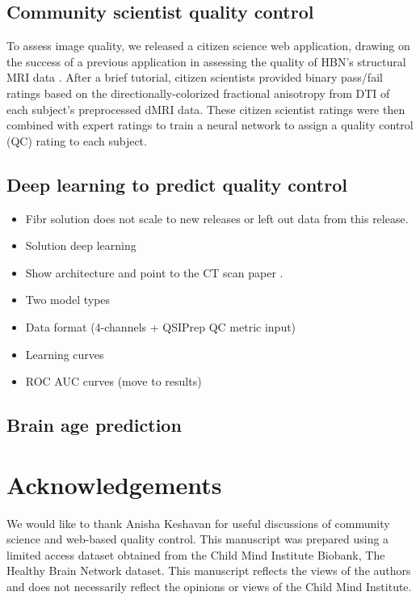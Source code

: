 \documentclass[fleqn,10pt]{wlscirep}
\begin{document}
\subsection*{Community scientist quality control}

To assess image quality, we released a citizen science web application, drawing on the success of a previous application in assessing the quality of HBN's structural MRI data \cite{keshavan2019-er}. After a brief tutorial, citizen scientists provided binary pass/fail ratings based on the directionally-colorized fractional anisotropy from DTI of each subject's preprocessed dMRI data. These citizen scientist ratings were then combined with expert ratings to train a neural network to assign a quality control (QC) rating to each subject.

\subsection*{Deep learning to predict quality control}

\begin{itemize}
    \item Fibr solution does not scale to new releases or left out data from this release.
    \item Solution deep learning
    \item Show architecture and point to the CT scan paper \cite{zunair2020-bs}.
    \item Two model types
    \item Data format (4-channels + QSIPrep QC metric input)
    \item Learning curves
    \item ROC AUC curves (move to results)
\end{itemize}

\subsection*{Brain age prediction}



\section*{Acknowledgements}

We would like to thank Anisha Keshavan for useful discussions of community science and web-based quality control. This manuscript was prepared using a limited access dataset obtained from the Child Mind Institute Biobank, The Healthy Brain Network dataset. This manuscript reflects the views of the authors and does not necessarily reflect the opinions or views of the Child Mind Institute.
\end{document}

